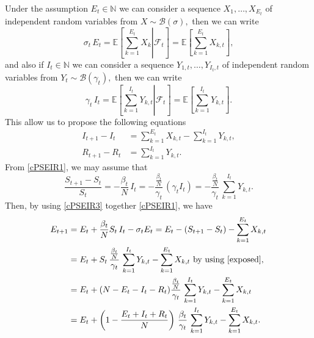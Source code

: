 \documentclass[12pt]{article}\usepackage[]{graphicx}\usepackage[]{color}
\begin{document}
Under the assumption $E_t \in \mathbb{N}$ we can consider a sequence $X_1,\ldots,X_{E_t}$ of independent random variables from $X \sim \mathcal{B}(\sigma),$ then we can write
$$
\sigma_t \, E_t = \mathbb{E}\left[\left. \sum_{k=1}^{E_t} X_{k} \right| \mathcal{F}_t  \right]
=  \mathbb{E}\left[\sum_{k=1}^{E_t} X_{k,t} \right],
$$
and also if $I_t \in \mathbb{N}$ we can consider a sequence $Y_{1,t},\ldots,Y_{I_t,t}$ of independent random variables from $Y_t \sim \mathcal{B}(\gamma_t),$ then we can write
$$
\gamma_t \, I_t = \mathbb{E}\left[\left. \sum_{k=1}^{I_t} Y_{k,t} \right| \mathcal{F}_t  \right]
=  \mathbb{E}\left[\sum_{k=1}^{I_t} Y_{k,t} \right].
$$
This allow us to propose the following equations 
\begin{align*}
I_{t+1}-I_t & =  \sum_{k=1}^{E_t} X_{k,t} -  \sum_{k=1}^{I_t} Y_{k,t},  \\ 
R_{t+1}-R_t & =  \sum_{k=1}^{I_t} Y_{k,t}. 
\end{align*}
From \eqref{cPSEIR1}, we may assume that
\begin{equation}\label{exposed}
\frac{S_{t+1}-S_t}{S_t} =  - \frac{\beta_t}{N} \,I_t = -\frac{\frac{\beta_t}{N}}{\gamma_t} \, (\gamma_t I_t)  
= -\frac{\frac{\beta_t}{N}}{\gamma_t} \, \sum_{k=1}^{I_t} Y_{k,t}.
\end{equation}
Then, by using \eqref{cPSEIR3} together \eqref{cPSEIR1}, we
have
\begin{align*}
E_{t+1} & = E_t + \frac{\beta_t}{N} S_t \,I_t - \sigma_t E_t = E_t - (S_{t+1}-S_t) - \sum_{k=1}^{E_t} X_{k,t} \\
& = E_t + S_t \, \frac{\frac{\beta_t}{N}}{\gamma_t} \, \sum_{k=1}^{I_t} Y_{k,t} - \sum_{k=1}^{E_t} X_{k,t} \text{ by using \eqref{exposed}, } \\
& =  E_t + (N-E_t-I_t-R_t) \frac{\frac{\beta_t}{N}}{\gamma_t} \, \sum_{k=1}^{I_t} Y_{k,t} - \sum_{k=1}^{E_t} X_{k,t} \\
& =  E_t + \left(1-\frac{E_t+I_t+R_t}{N}\right)\, \frac{\beta_t}{\gamma_t} \, \sum_{k=1}^{I_t} Y_{k,t} - \sum_{k=1}^{E_t} X_{k,t}.
\end{align*}
\end{document}
